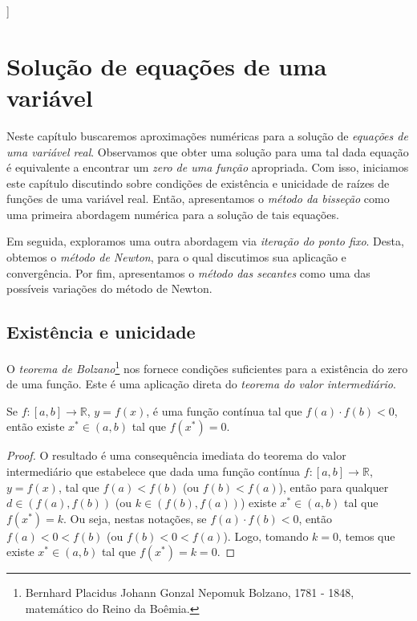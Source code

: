 ]%

%

\chapter{Solução de equações de uma variável}

Neste capítulo buscaremos aproximações numéricas para a solução de \emph{equações de uma variável real}. Observamos que obter uma solução para uma tal dada equação é equivalente a encontrar um \emph{zero de uma função} apropriada. Com isso, iniciamos este capítulo discutindo sobre condições de existência e unicidade de raízes de funções de uma variável real. Então, apresentamos o \emph{método da bisseção} como uma primeira abordagem numérica para a solução de tais equações.

Em seguida, exploramos uma outra abordagem via \emph{iteração do ponto fixo}. Desta, obtemos o \emph{método de Newton}, para o qual discutimos sua aplicação e convergência. Por fim, apresentamos o \emph{método das secantes} como uma das possíveis variações do método de Newton.

\section{Existência e unicidade}

O \emph{teorema de Bolzano}\footnote{Bernhard Placidus Johann Gonzal Nepomuk Bolzano, 1781 - 1848, matemático do Reino da Boêmia.} nos fornece condições suficientes para a existência do zero de uma função. Este é uma aplicação direta do \emph{teorema do valor intermediário}.

\begin{teo}\label{teo:teorema_de_Bolzano}
  Se $f:[a, b]\to\mathbb{R}$, $y = f(x)$, é uma função contínua tal que $f(a)\cdot f(b) < 0$, então existe $x^*\in (a, b)$ tal que $f(x^*) = 0$.
\end{teo}
\begin{proof}
  O resultado é uma consequência imediata do teorema do valor intermediário que estabelece que dada uma função contínua $f:[a, b]\to\mathbb{R}$, $y = f(x)$, tal que $f(a) < f(b)$ (ou $f(b) < f(a)$), então para qualquer $d\in \left(f(a), f(b)\right)$ (ou $k\in \left(f(b), f(a)\right)$) existe $x^*\in (a, b)$ tal que $f(x^*) = k$. Ou seja, nestas notações, se $f(a)\cdot f(b) < 0$, então $f(a) < 0 < f(b)$ (ou $f(b) < 0 < f(a)$). Logo, tomando $k = 0$, temos que existe $x^*\in (a, b)$ tal que $f(x^*) = k = 0$.
\end{proof}

